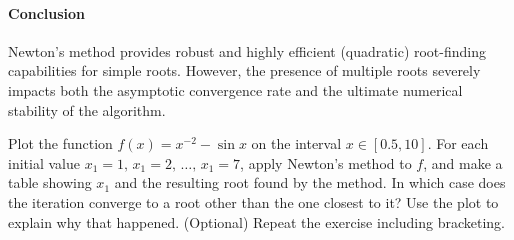 \begin{solution}
	\paragraph{Conclusion}
	Newton's method provides robust and highly efficient (quadratic)
	root-finding capabilities for simple roots. However, the presence of
	multiple roots severely impacts both the asymptotic convergence rate and the
	ultimate numerical stability of the algorithm.
\end{solution}

\begin{exercise}
	Plot the function $f(x)=x^{-2} - \sin x$ on the interval $x \in [0.5,10]$.
	For each initial value $x_1=1,\, x_1=2,\,\ldots,\, x_1=7$, apply Newton's
	method to $f$, and make a table showing $x_1$ and the resulting root found
	by the method. In which case does the iteration converge to a root other
	than the one closest to it? Use the plot to explain why that happened.
	(Optional) Repeat the exercise including bracketing.
\end{exercise}

